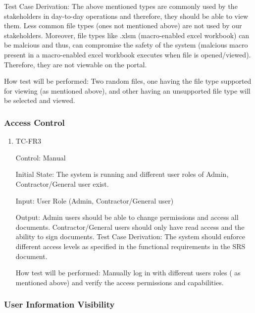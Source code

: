 \documentclass[12pt, titlepage]{article}
\begin{document}
\begin{enumerate}
    Test Case Derivation: The above mentioned types are commonly used by the
    stakeholders in day-to-day operations and therefore, they should be able to
    view them. Less common file types (ones not mentioned above) are not used by
    our stakeholders. Moreover, file types like .xlsm (macro-enabled excel
    workbook) can be malcious and thus, can compromise the safety of the system
    (malcious macro present in a macro-enabled excel workbook executes when file
    is opened/viewed). Therefore, they are not viewable on the portal.

    How test will be performed: Two random files, one having the file type
    supported for viewing (as mentioned above), and other having an unsupported
    file type will be selected and viewed.

\end{enumerate}

\subsubsection{Access Control}

\begin{enumerate}
  \item {TC-FR3\\}

    Control: Manual

    Initial State: The system is running and different user roles of Admin,
    Contractor/General user exist.

    Input: User Role (Admin, Contractor/General user)

    Output: Admin users should be able to change permissions and access all
    documents. Contractor/General users should only have read access and the
    ability to sign documents.
    Test Case Derivation: The system should enforce different access levels as
    specified in the functional requirements in the SRS document.

    How test will be performed: Manually log in with different users roles (
    as mentioned above) and verify the access permissions and capabilities.

\end{enumerate}

\subsubsection{User Information Visibility}
\end{document}
